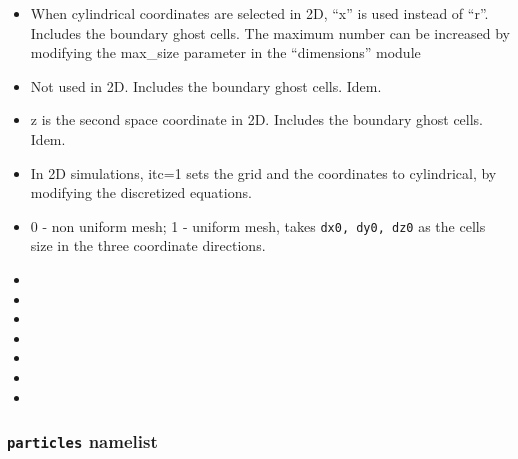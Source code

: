 \begin{itemize}
\item
{}
{When cylindrical coordinates are selected in 2D, ``x'' is used instead 
 of ``r''. Includes the boundary ghost cells. The maximum number can be 
 increased by modifying the max\_size parameter in the ``dimensions'' module}

\item
{}
{Not used in 2D. Includes the boundary ghost cells. Idem.}

\item
{}
{z is the second space coordinate in 2D. Includes the boundary ghost cells.
Idem. }

\item
{}
{In 2D simulations, itc=1 sets the grid and the coordinates to cylindrical,
by modifying the discretized equations.}

\item
{}
{0 - non uniform mesh; 1 - uniform mesh, takes {\tt dx0, dy0, dz0} as the
cells size in the three coordinate directions.}

\item
{}
{}

\item
{}
{}

\item
{}
{}

\item
{}
{}

\item
{}
{}

\item
{}
{}

\item
{}
{}

\end{itemize}

\subsubsection{ {\tt particles} namelist}

